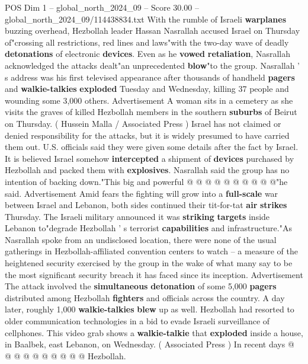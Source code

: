 \begin{textsample}{POS Dim 1 – global\_north\_2024\_09 – Score 30.00 – global\_north\_2024\_09/114438834.txt}  \label{ex:f1_pos_096}
With the rumble of Israeli \textbf{warplanes} buzzing overhead, Hezbollah leader Hassan Nasrallah accused Israel on Thursday of"crossing all restrictions, red lines and laws"with the two-day wave of deadly \textbf{detonations} of electronic \textbf{devices}.
Even as he \textbf{vowed} \textbf{retaliation}, Nasrallah acknowledged the attacks dealt"an unprecedented \textbf{blow}"to the group.
Nasrallah ' s address was his first televised appearance after thousands of handheld \textbf{pagers} and \textbf{walkie-talkies} \textbf{exploded} Tuesday and Wednesday, killing 37 people and wounding some 3,000 others.
Advertisement A woman sits in a cemetery as she visits the graves of killed Hezbollah members in the southern \textbf{suburbs} of Beirut on Thursday. ( Hussein Malla / Associated Press ) Israel has not claimed or denied responsibility for the attacks, but it is widely presumed to have carried them out.
U.S. officials said they were given some details after the fact by Israel.
It is believed Israel somehow \textbf{intercepted} a shipment of \textbf{devices} purchased by Hezbollah and packed them with \textbf{explosives}.
Nasrallah said the group has no intention of backing down."This big and powerful @ @ @ @ @ @ @ @ @ @"he said.
Advertisement Amid fears the fighting will grow into a \textbf{full-scale} war between Israel and Lebanon, both sides continued their tit-for-tat \textbf{air} \textbf{strikes} Thursday.
The Israeli military announced it was \textbf{striking} \textbf{targets} inside Lebanon to"degrade Hezbollah ' s terrorist \textbf{capabilities} and infrastructure."As Nasrallah spoke from an undisclosed location, there were none of the usual gatherings in Hezbollah-affiliated convention centers to watch -- a measure of the heightened security exercised by the group in the wake of what many say to be the most significant security breach it has faced since its inception.
Advertisement The attack involved the \textbf{simultaneous} \textbf{detonation} of some 5,000 \textbf{pagers} distributed among Hezbollah \textbf{fighters} and officials across the country.
A day later, roughly 1,000 \textbf{walkie-talkies} \textbf{blew} up as well.
Hezbollah had resorted to older communication technologies in a bid to evade Israeli surveillance of cellphones.
This video grab shows a \textbf{walkie-talkie} that \textbf{exploded} inside a house, in Baalbek, east Lebanon, on Wednesday. ( Associated Press ) In recent days @ @ @ @ @ @ @ @ @ @ Hezbollah.

\end{textsample}
